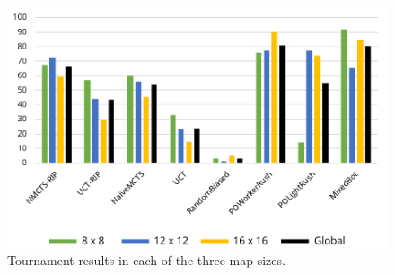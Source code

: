 \documentclass[conference]{IEEEtran}
\begin{document}
\begin{figure}[!t]
\begin{center}
	\includegraphics[width=1\columnwidth]{figs/TR.pdf}
	\caption{Tournament results in each of the three map sizes.}
	\label{TournamentResultsAllMaps}
\end{center}
\end{figure}
\end{document}
